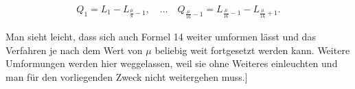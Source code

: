 \begin{landscape}
\[\begin{gathered}
Q_1 = L_1 - L_{\frac{\mu}{8}-1}, \quad \ldots \quad Q_{\frac{\mu}{16}-1} = L_{\frac{\mu}{16}-1} - L_{\frac{\mu}{16}+1}.
\end{gathered}
\]
\par\noindent\hspace*{\parindent}Man sieht leicht, dass sich auch Formel 14 weiter umformen lässt und das Verfahren je nach dem Wert von \(\mu\) beliebig weit fortgesetzt werden kann. Weitere Umformungen werden hier weggelassen, weil sie ohne Weiteres einleuchten und man für den vorliegenden Zweck nicht weitergehen muss.]
\par
\endgroup
\end{landscape}
